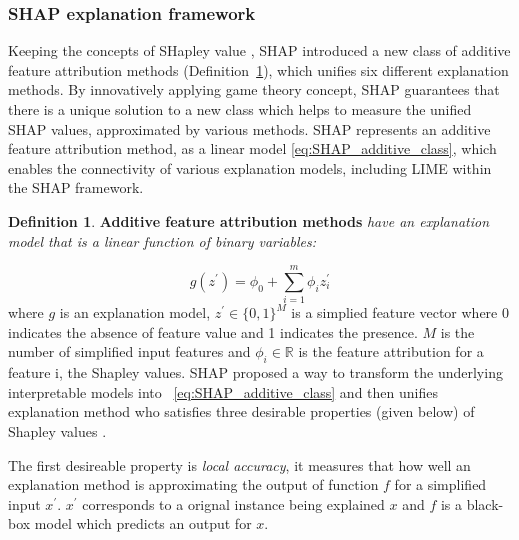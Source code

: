 \documentclass[english]{tktltiki2}
\theoremstyle{definition}
\newtheorem{definition}[thm]{Definition}
\theoremstyle{remark}
\begin{document}
\subsubsection{SHAP explanation framework} %
Keeping the concepts of SHapley value \citep{shapley1953value}, SHAP \citep{lundberg2017unified} introduced a new class of additive feature attribution methods (Definition~\ref{def:SHAP_additive_class}), which unifies six different explanation methods. By innovatively applying game theory concept, SHAP guarantees that there is a unique solution to a new class which helps to measure the unified SHAP values, approximated by various methods. SHAP represents an additive feature attribution method, as a linear model \eqref{eq:SHAP_additive_class}, which enables the connectivity of various explanation models, including LIME \citep{ribeiro2016should} within the SHAP framework.

\begin{definition}\label{def:SHAP_additive_class}{\textbf{Additive feature attribution methods} \textit{have an explanation model that is a linear
function of binary variables:}}
\end{definition}

\begin{equation}\label{eq:SHAP_additive_class}
	g(z^\prime) =  \phi_0 + \sum_{i=1}^{m} \phi_i z_i^\prime 
\end{equation}
where $g$ is an explanation model, $z^\prime \in \{0,1\}^{M}$ is a simplied feature vector where 0 indicates the absence of feature value and 1 indicates the presence. $M$ is the number of simplified input features and $\phi_i \in \mathbb{R}$ is the feature attribution for a feature i, the Shapley values. SHAP proposed a way to transform the underlying interpretable models into ~\eqref{eq:SHAP_additive_class} and then unifies explanation method who satisfies three desirable properties (given below) of Shapley values \citep{molnarinterpretable}.

The first desireable property is \textit{local accuracy}, it measures that how well an explanation method is approximating the output of function $f$ for a simplified input $x^\prime$. $x^\prime$ corresponds to a orignal instance being explained $x$ and $f$ is a black-box model which predicts an output for $x$.
\end{document}
